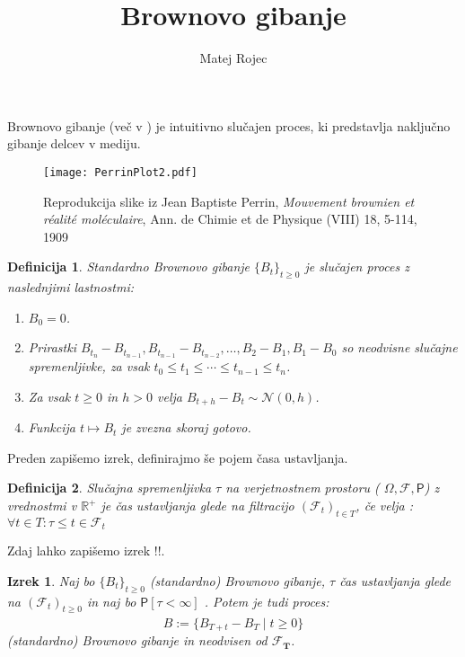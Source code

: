 \documentclass[11pt]{article}
\title{Brownovo gibanje}
\author{Matej Rojec}
\date{}
\newtheorem{definition}{Definicija}
\newtheorem{izrek}{Izrek}
\newcommand{\f}{\mathcal{F}}
\begin{document}
\maketitle


Brownovo gibanje (več v \cite{karatzas1991brownian} ) je intuitivno slučajen proces, %
ki predstavlja naključno gibanje delcev v mediju.
\begin{figure}[h]
    \centering
    \texttt{[image: PerrinPlot2.pdf]}
    \caption{Reprodukcija slike iz Jean Baptiste Perrin, \emph{Mouvement brownien et réalité moléculaire}, Ann. de Chimie et de Physique (VIII) 18, 5-114, 1909}
    \label{fig:}
   
\end{figure}

    \begin{definition}
        Standardno Brownovo gibanje $\{B_t\}_{t \geq 0}$ je slučajen proces z naslednjimi lastnostmi: 
        \begin{enumerate}
            
        \item $B_0 = 0$.
        \item Prirastki $B_{t_n} - B_{t_{n-1}}, B_{t_{n-1}} - B_{t_{n-2}}, \ldots, B_2 - B_1, B_1 - B_0$ so neodvisne slučajne spremenljivke, za vsak $t_0 \leq t_1 \leq \cdots \leq t_{n-1} \leq t_n$.
        \item Za vsak $t \geq 0$ in $h > 0$ velja $B_{t+h} - B_t \sim \mathcal{N}(0, h)$.
        \item Funkcija $t \mapsto B_t$ je zvezna skoraj gotovo.
        \end{enumerate}
        
    \end{definition}

    
    Preden zapišemo izrek, definirajmo še pojem časa ustavljanja.
    
    \begin{definition}
    Slučajna spremenljivka $\tau$ na verjetnostnem prostoru ( $\Omega , \f , \mathsf{P}$)  z vrednostmi v $ \mathbb{R}^+$
    je čas ustavljanja glede na filtracijo $(\f_t)_{t\in T}$, če velja :$ \forall t \in T : {\tau \leq t} \in \f_t$
        
    \end{definition}

    
    Zdaj lahko zapišemo izrek !!. %
    \begin{izrek}
    Naj bo $\{B_t\}_{t \geq 0}$ (standardno) Brownovo gibanje, $\tau$ čas ustavljanja glede na 
    $(\f_t)_{t\geq 0}$ in naj bo $\mathsf{P}[\tau < \infty]$ .
    Potem je tudi proces:
    \[
    \hat{B} := \{B_{T+t} - B_T \mid t \geq 0\}
    \]
    (standardno) Brownovo gibanje in neodvisen od $\f_\mathbf{T} $.
    \end{izrek}  
    \printbibliography
\end{document}

